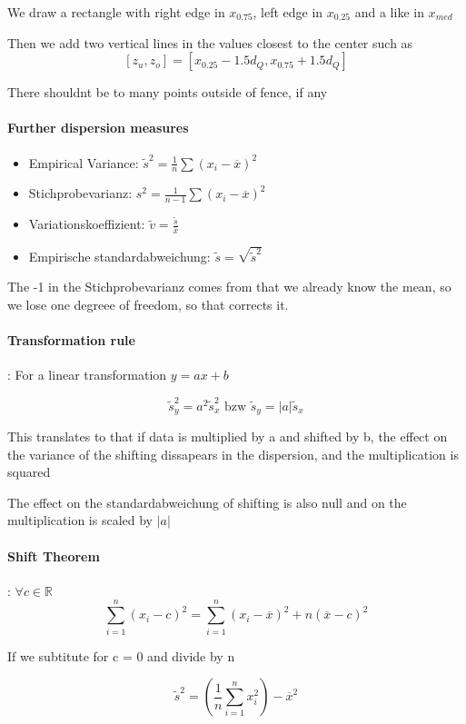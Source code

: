 \documentclass{article}
\begin{document}
We draw a rectangle with right edge in $x_{0.75}$, left edge in $x_{0.25}$ and a like in $x_{med}$


Then we add two vertical lines in the values closest to the center such as
\[[z_u,z_o] = [x_{0.25} - 1.5d_Q, x_{0.75} +1.5d_Q]\] 

There shouldnt be to many points outside of fence, if any

\paragraph{Further dispersion measures}
\begin{itemize}
    \item Empirical Variance: $\tilde{s}^2 = \frac{1}{n}\sum (x_i - \overline{x})^2$
    \item Stichprobevarianz: $s^2 = \frac{1}{n-1}\sum(x_i-\overline{x})^2$
    \item Variationskoeffizient: $\tilde{v} = \frac{\tilde{s}}{\overline{x}}$
    \item Empirische standardabweichung: $\tilde{s} = \sqrt{\tilde{s}^2}$
\end{itemize}

The -1 in the Stichprobevarianz comes from that we already know the mean, so we lose one degreee of freedom, so that corrects it.


\paragraph{Transformation rule}: For a linear transformation $y = ax+b$

\[\tilde{s}_y^2 = a^2\tilde{s}_x^2 \text{ bzw } \tilde{s}_y = |a|\tilde{s}_x \]

This translates to that if data is multiplied by a and shifted by b, the effect on the variance of the shifting dissapears in the dispersion, and the multiplication is squared

The effect on the standardabweichung of shifting is also null and on the multiplication is scaled by $|a|$

\paragraph{Shift Theorem}: $\forall c\in \mathbb{R}$
\[\sum_{i=1}^n(x_i - c)^2 = \sum_{i=1}^n(x_i-\overline{x})^2 + n(\overline{x} - c)^2\]

If we subtitute for c = 0 and divide by n

\[\tilde{s}^2 = \left( \frac{1}{n}\sum_{i=1}^nx_i^2\right) - \overline{x}^2\]
\end{document}
